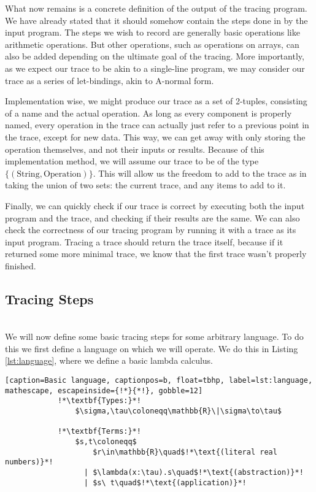     What now remains is a concrete definition of the output of the tracing program.
    We have already stated that it should somehow contain the steps done in by the input program.
    The steps we wish to record are generally basic operations like arithmetic operations.
    But other operations, such as operations on arrays, can also be added depending on the ultimate goal of the tracing.
    More importantly, as we expect our trace to be akin to a single-line program, we may consider our trace as a series of let-bindings, akin to A-normal form\cn.
    
    Implementation wise, we might produce our trace as a set of 2-tuples, consisting of a name and the actual operation.
    As long as every component is properly named, every operation in the trace can actually just refer to a previous point in the trace, except for new data.
    This way, we can get away with only storing the operation themselves, and not their inputs or results.
    Because of this implementation method, we will assume our trace to be of the type $\{(\text{String},\text{Operation})\}$.
    This will allow us the freedom to add to the trace as in taking the union of two sets: the current trace, and any items to add to it.
    
    Finally, we can quickly check if our trace is correct by executing both the input program and the trace, and checking if their results are the same.
    We can also check the correctness of our tracing program by running it with a trace as its input program.
    Tracing a trace should return the trace itself, because if it returned some more minimal trace, we know that the first trace wasn't properly finished.

    \subsection{Tracing Steps}
        \\
        We will now define some basic tracing steps for some arbitrary language.
        To do this we first define a language on which we will operate.
        We do this in Listing \ref{lst:language}, where we define a basic lambda calculus.

        \begin{lstlisting}[caption=Basic language, captionpos=b, float=tbhp, label=lst:language, mathescape, escapeinside={!*}{*!}, gobble=12]
            !*\textbf{Types:}*!
                $\sigma,\tau\coloneqq\mathbb{R}\|\sigma\to\tau$

            !*\textbf{Terms:}*!
                $s,t\coloneqq$
                    $r\in\mathbb{R}\quad$!*\text{(literal real numbers)}*!
                  | $\lambda(x:\tau).s\quad$!*\text{(abstraction)}*!
                  | $s\ t\quad$!*\text{(application)}*!
        \end{lstlisting}

